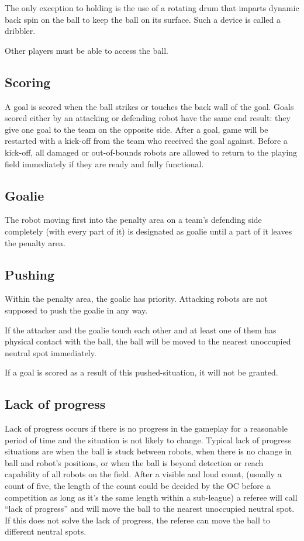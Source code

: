 \documentclass{article}
\begin{document}
The only exception to holding is the use of a rotating drum that imparts dynamic back spin on the ball to keep the ball on its surface. Such a device is called a dribbler.

Other players must be able to access the ball.

\subsection{Scoring \label{ref-007}}

A goal is scored when the ball strikes or touches the back wall of the goal. Goals scored either by an attacking or defending robot have the same end result: they give one goal to the team on the opposite side. After a goal, game will be restarted with a kick-off from the team who received the goal against. Before a kick-off, all damaged or out-of-bounds robots are allowed to return to the playing field immediately if they are ready and fully functional.

\subsection{Goalie \label{ref-008}}

The robot moving first into the penalty area on a team's defending side completely (with every part of it) is designated as goalie until a part of it leaves the penalty area.

\subsection{Pushing \label{ref-009}}

Within the penalty area, the goalie has priority. Attacking robots are not supposed to push the goalie in any way.

If the attacker and the goalie touch each other and at least one of them has physical contact with the ball, the ball will be moved to the nearest unoccupied neutral spot immediately.

If a goal is scored as a result of this pushed-situation, it will not be granted.

\subsection{Lack of progress \label{ref-010}}

Lack of progress occurs if there is no progress in the gameplay for a reasonable period of time and the situation is not likely to change. Typical lack of progress situations are when the ball is stuck between robots, when there is no change in ball and robot's positions, or when the ball is beyond detection or reach capability of all robots on the field. After a visible and loud count, (usually a count of five, the length of the count could be decided by the OC before a competition as long as it's the same length within a sub-league) a referee will call ``lack of progress'' and will move the ball to the nearest unoccupied neutral spot. If this does not solve the lack of progress, the referee can move the ball to different neutral spots.
\end{document}

